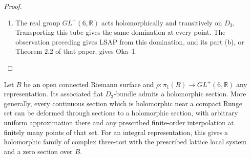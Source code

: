\begin{proof}
\begin{enumerate}[label={$\langle1\rangle$\arabic*.}]
\item The real group $GL^+(6,\mathbb R)$ acts holomorphically and
transitively on $D_3$.  Transporting this tube gives the same
domination at every point.  The observation preceding
\cite[Proposition 7.13 and preceding paragraph, pp.~23--24]{IVVOkaOneV5} gives LSAP from
this domination, and its part (b), or Theorem 2.2 of that paper,
gives Oka--1.

\end{enumerate}
\end{proof}




\begin{theorem}\hypertarget{tag-02OB}{}\label{maps:src:F.3.9}


Let $B$ be an open connected Riemann surface and
$\rho:\pi_1(B)\to GL^+(6,\mathbb R)$ any representation.
Its associated flat $D_3$-bundle admits a holomorphic section.
More generally, every continuous section which is holomorphic
near a compact Runge set can be deformed through sections to a
holomorphic section, with arbitrary uniform approximation there
and any prescribed finite-order interpolation at finitely many
points of that set.  For an integral representation, this gives
a holomorphic family of complex three-tori with the prescribed
lattice local system and a zero section over $B$.

\end{theorem}


